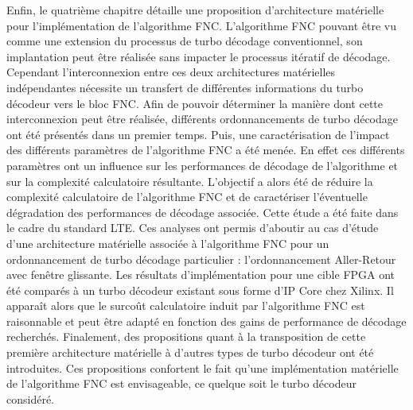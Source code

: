 Enfin, le quatrième chapitre détaille une proposition d'architecture matérielle pour l'implémentation de l'algorithme
FNC. L'algorithme FNC pouvant être vu comme une extension du processus de turbo décodage conventionnel, son implantation
peut être réalisée sans impacter le processus itératif de décodage. Cependant l'interconnexion entre ces deux architectures 
matérielles indépendantes nécessite un transfert de différentes informations du turbo décodeur vers le bloc FNC. Afin
de pouvoir déterminer la manière dont cette interconnexion peut être réalisée, différents ordonnancements de turbo décodage 
ont été présentés dans un premier temps. Puis, une caractérisation de l'impact des différents paramètres de 
l'algorithme FNC a été menée. En effet ces différents paramètres ont un influence sur les performances de décodage de 
l'algorithme et sur la complexité calculatoire résultante. L'objectif a alors été de réduire la complexité calculatoire de 
l'algorithme FNC et de caractériser l'éventuelle dégradation des performances de décodage associée. Cette étude
a été faite dans le cadre du standard LTE. Ces analyses ont permis d'aboutir au cas d'étude d'une architecture 
matérielle associée à l'algorithme FNC pour un ordonnancement de turbo décodage particulier : l'ordonnancement Aller-Retour
avec fenêtre glissante. Les résultats d'implémentation
pour une cible FPGA ont été comparés à un turbo décodeur existant sous forme d'IP Core chez Xilinx. Il apparaît alors que le
surcoût calculatoire induit par l'algorithme FNC est raisonnable et peut être adapté en fonction des gains de
performance de décodage recherchés. Finalement, des propositions quant à la transposition de cette première architecture
matérielle à d'autres types de turbo décodeur ont été introduites. Ces propositions confortent le fait qu'une implémentation matérielle 
de l'algorithme FNC est envisageable, ce quelque soit le turbo décodeur considéré.

